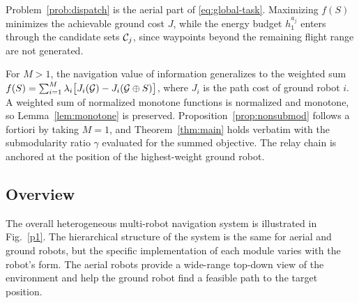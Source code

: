 Problem~\ref{prob:dispatch} is the aerial part of \eqref{eq:global-task}. Maximizing $f(S)$ minimizes the achievable ground cost $J$, while the energy budget $h_1^{a_j}$ enters through the candidate sets $\mathcal{C}_j$, since waypoints beyond the remaining flight range are not generated.

\begin{remark}
\label{rem:multi-ugv}
For $M > 1$, the navigation value of information generalizes to the weighted sum $f(S) = \sum_{i=1}^{M} \lambda_i \bigl[ J_i(\mathcal{G}) - J_i(\mathcal{G} \oplus S) \bigr]$, where $J_i$ is the path cost of ground robot $i$. A weighted sum of normalized monotone functions is normalized and monotone, so Lemma~\ref{lem:monotone} is preserved. Proposition~\ref{prop:nonsubmod} follows a fortiori by taking $M = 1$, and Theorem~\ref{thm:main} holds verbatim with the submodularity ratio $\gamma$ evaluated for the summed objective. The relay chain is anchored at the position of the highest-weight ground robot.
\end{remark}


\subsection{Overview}

The overall heterogeneous multi-robot navigation system is illustrated in Fig.~\ref{p1}. The hierarchical structure of the system is the same for aerial and ground robots, but the specific implementation of each module varies with the robot's form. The aerial robots provide a wide-range top-down view of the environment and help the ground robot find a feasible path to the target position.

